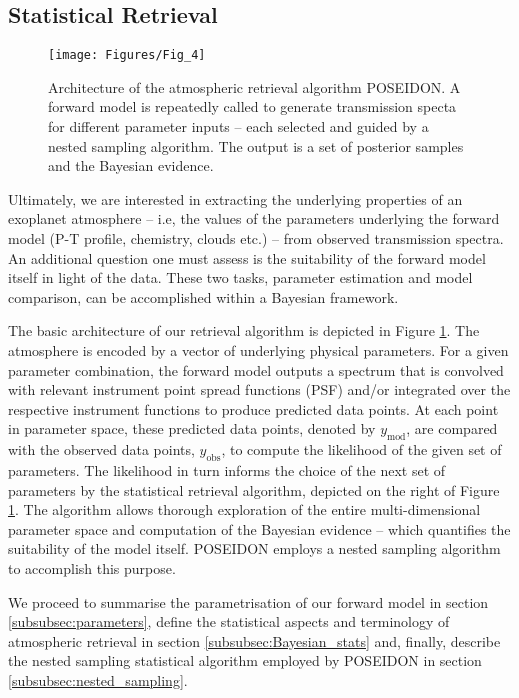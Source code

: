 \documentclass[fleqn,usenatbib]{mnras}
\begin{document}
\subsection{Statistical Retrieval}\label{subsec:stats}

\begin{figure}
	\texttt{[image: Figures/Fig\_4]}
    \caption{Architecture of the atmospheric retrieval algorithm POSEIDON. A forward model is repeatedly called to generate transmission specta for different parameter inputs -- each selected and guided by a nested sampling algorithm. The output is a set of posterior samples and the Bayesian evidence.}
    \label{fig:Architecture}
\end{figure}

Ultimately, we are interested in extracting the underlying properties of an exoplanet atmosphere -- i.e, the values of the parameters underlying the forward model (P-T profile, chemistry, clouds etc.) -- from observed transmission spectra. An additional question one must assess is the suitability of the forward model itself in light of the data. These two tasks, parameter estimation and model comparison, can be accomplished within a Bayesian framework.

The basic architecture of our retrieval algorithm is depicted in Figure \ref{fig:Architecture}. The atmosphere is encoded by a vector of underlying physical parameters. For a given parameter combination, the forward model outputs a spectrum that is convolved with relevant instrument point spread functions (PSF) and/or integrated over the respective instrument functions to produce predicted data points. At each point in parameter space, these predicted data points, denoted by $y_{\mathrm{mod}}$, are compared with the observed data points, $y_{\mathrm{obs}}$, to compute the likelihood of the given set of parameters. The likelihood in turn informs the choice of the next set of parameters by the statistical retrieval algorithm, depicted on the right of Figure \ref{fig:Architecture}. The algorithm allows thorough exploration of the entire multi-dimensional parameter space and computation of the Bayesian evidence -- which quantifies the suitability of the model itself. POSEIDON employs a nested sampling algorithm to accomplish this purpose.

We proceed to summarise the parametrisation of our forward model in section \ref{subsubsec:parameters}, define the statistical aspects and terminology of atmospheric retrieval in section \ref{subsubsec:Bayesian_stats} and, finally, describe the nested sampling statistical algorithm employed by POSEIDON in section \ref{subsubsec:nested_sampling}.
\end{document}
